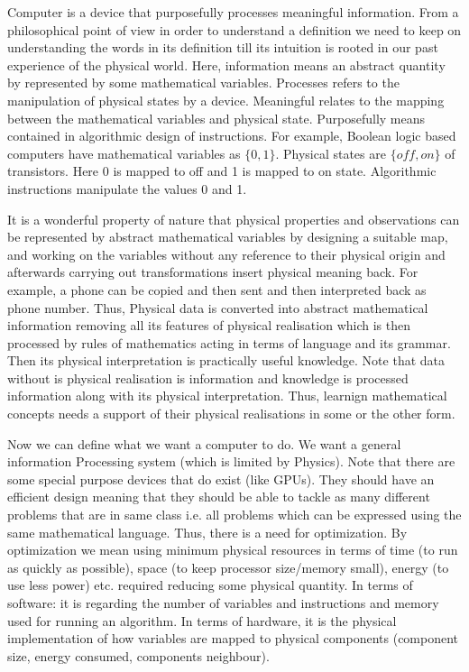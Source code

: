 \documentclass[12pt, oneside]{book}
\theoremstyle{definition}
\theoremstyle{definition}
\theoremstyle{remark}
\begin{document}
Computer is a device that purposefully processes meaningful information. From a philosophical point of view in order to understand a definition we need to keep on understanding the words in its definition till its intuition is rooted in our past experience of the physical world. Here, information means an abstract quantity by represented by some mathematical variables. Processes refers to the manipulation of physical states by a device. Meaningful relates to the mapping between the mathematical variables and physical state. Purposefully means contained in algorithmic design of instructions. For example, Boolean logic based computers have mathematical variables as $\{0,1\}$. Physical states are $\{off,on\}$ of transistors. Here 0 is mapped to off and 1 is mapped to on state. Algorithmic instructions manipulate the values 0 and 1.

It is a wonderful property of nature that physical properties and observations can be represented by abstract mathematical variables by designing a suitable map, and working on the variables without any reference to their physical origin and afterwards carrying out transformations insert physical meaning back. For example, a phone can be copied and then sent and then interpreted back as phone number. Thus, Physical data is converted into abstract mathematical information removing all its features of physical realisation which is then processed by rules of mathematics acting in terms of language and its grammar. Then its physical interpretation is practically useful knowledge. Note that data without is physical realisation is information and knowledge is processed information along with its physical interpretation. Thus, learnign mathematical concepts needs a support of their physical realisations in some or the other form.

Now we can define what we want a computer to do. We want a general information Processing system (which is limited by Physics). Note that there are some special purpose devices that do exist (like GPUs). They should have an efficient design meaning that they should be able to tackle as many different problems that are in same class i.e. all problems which can be expressed using the same mathematical language. Thus, there is a need for optimization. By optimization we mean using minimum physical resources in terms of time (to run as quickly as possible), space (to keep processor size/memory small), energy (to use less power) etc. required reducing some physical quantity. In terms of software: it is regarding the number of variables and instructions and memory used for running an algorithm. In terms of hardware, it is the physical implementation of how variables are mapped to physical components (component size, energy consumed, components neighbour).
\end{document}
